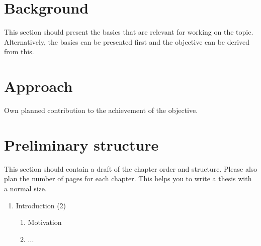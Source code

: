 \documentclass[a4paper, 11pt]{article}
\begin{document}
\section{Background}
\label{basics}
This section should present the basics that are relevant for working on the topic. Alternatively, the basics can be presented first and the objective can be derived from this.
\section{Approach}
\label{approach}
Own planned contribution to the achievement of the objective.

\section{Preliminary structure}
\label{structure}
This section should contain a draft of the chapter order and structure. Please also plan the number of pages for each chapter. This helps you to write a thesis with a normal size.
\begin{enumerate}
	\item Introduction (2)
	\begin{enumerate}
		\item Motivation
		\item ...
	\end{enumerate}
\end{enumerate}

\end{document}
